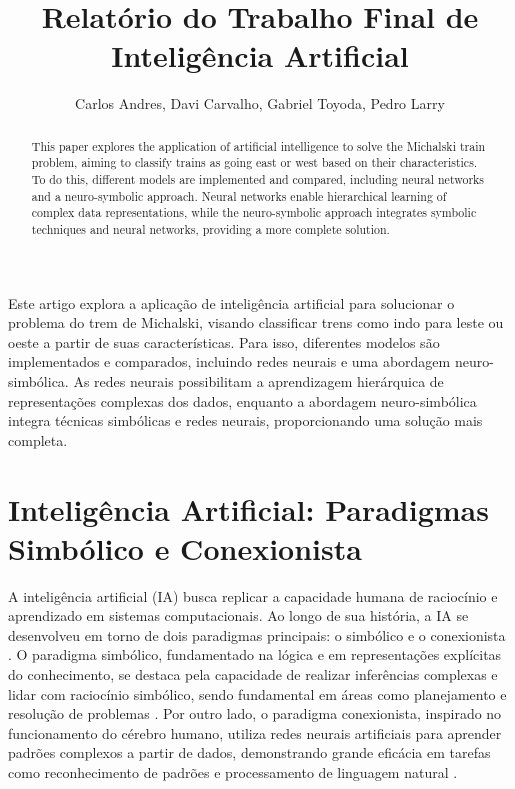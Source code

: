 \documentclass[12pt]{article}
\title{Relatório do Trabalho Final de Inteligência Artificial}
\author{Carlos Andres\inst{1}, Davi Carvalho\inst{1}, Gabriel Toyoda\inst{1}, Pedro Larry\inst{1}}
\begin{document}
 

\maketitle

\begin{abstract}
  This paper explores the application of artificial intelligence to solve the Michalski train problem, aiming to classify trains as going east or west based on their characteristics. To do this, different models are implemented and compared, including neural networks and a neuro-symbolic approach. Neural networks enable hierarchical learning of complex data representations, while the neuro-symbolic approach integrates symbolic techniques and neural networks, providing a more complete solution.
\end{abstract}
     
\begin{resumo} 
  Este artigo explora a aplicação de inteligência artificial para solucionar o problema do trem de Michalski, visando classificar trens como indo para leste ou oeste a partir de suas características. Para isso, diferentes modelos são implementados e comparados, incluindo redes neurais e uma abordagem neuro-simbólica. As redes neurais possibilitam a aprendizagem hierárquica de representações complexas dos dados, enquanto a abordagem neuro-simbólica integra técnicas simbólicas e redes neurais, proporcionando uma solução mais completa.
\end{resumo}


\section{Inteligência Artificial: Paradigmas Simbólico e Conexionista}

A inteligência artificial (IA) busca replicar a capacidade humana de raciocínio e aprendizado em sistemas computacionais.  Ao longo de sua história, a IA se desenvolveu em torno de dois paradigmas principais: o simbólico e o conexionista \cite{russell2003artificial}. O paradigma simbólico,  fundamentado na lógica e em representações explícitas do conhecimento,  se destaca pela capacidade de realizar inferências complexas e lidar com raciocínio simbólico,  sendo fundamental em áreas como planejamento e resolução de problemas \cite{haugeland1989artificial}. Por outro lado, o paradigma conexionista,  inspirado no funcionamento do cérebro humano,  utiliza redes neurais artificiais para aprender padrões complexos a partir de dados,  demonstrando grande eficácia em tarefas como reconhecimento de padrões e processamento de linguagem natural \cite{haykin2009neural}.
\end{document}
